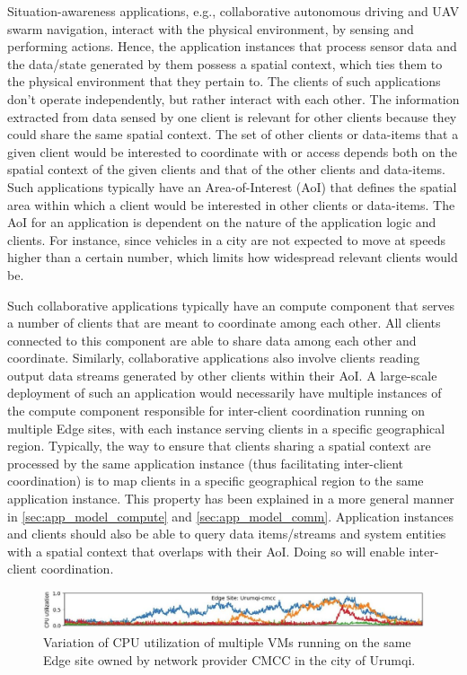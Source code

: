 \par Situation-awareness applications, e.g., collaborative autonomous driving and UAV swarm navigation, interact with the physical environment, by sensing and performing actions. Hence, the application instances that process sensor data and the data/state generated by them possess a spatial context, which ties them to the physical environment that they pertain to. The clients of such applications don't operate independently, but rather interact with each other. The information extracted from data sensed by one client is relevant for other clients because they could share the same spatial context. The set of other clients or data-items that a given client would be interested to coordinate with or access depends both on the spatial context of the given clients and that of the other clients and data-items. Such applications typically have an Area-of-Interest (AoI) that defines the spatial area within which a client would be interested in other clients or data-items. The AoI for an application is dependent on the nature of the application logic and clients. For instance, since vehicles in a city are not expected to move at speeds higher than a certain number, which limits how widespread relevant clients would be.
\par Such collaborative applications typically have an compute component that serves a number of clients that are meant to coordinate among each other. All clients connected to this component are able to share data among each other and coordinate. Similarly, collaborative applications also involve clients reading output data streams generated by other clients within their AoI. A large-scale deployment of such an application would necessarily have multiple instances of the compute component responsible for inter-client coordination running on multiple Edge sites, with each instance serving clients in a specific geographical region. Typically, the way to ensure that clients sharing a spatial context are processed by the same application instance (thus facilitating inter-client coordination) is to map clients in a specific geographical region to the same application instance. This property has been explained in a more general manner in \cref{sec:app_model_compute} and \cref{sec:app_model_comm}. Application instances and clients should also be able to query data items/streams and system entities with a spatial context that overlaps with their AoI. Doing so will enable inter-client coordination.
\begin{figure}
\centering
\includegraphics[width=\linewidth]{figures/mechanisms/spatial_ctx_mgmt/urumqi_cpu_util.JPG}
\caption{Variation of CPU utilization of multiple VMs running on the same Edge site owned by network provider CMCC in the city of Urumqi.}
\label{fig:vm_util}
\end{figure}
